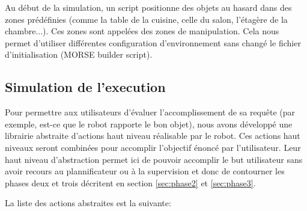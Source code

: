 \documentclass[a4paper,11pt,twoside]{StyleThese}
\begin{document}
 
Au début de la simulation, un script positionne des objets au hasard dans des zones prédéfinies (comme la table de la cuisine, celle du salon, l'étagère de la chambre...). Ces zones sont appelées des zones de manipulation. Cela nous permet d'utiliser différentes configuration d'environnement sans changé le fichier d'initialisation (MORSE builder script).

\subsection{Simulation de l'execution}
\label{section:actions}
Pour permettre aux utilisateurs d'évaluer l'accomplissement de sa requête (par exemple, est-ce que le robot rapporte le bon objet), nous avons développé une librairie abstraite d'actions haut niveau réalisable par le robot. Ces actions haut niveaux seront combinées pour accomplir l'objectif énoncé par l'utilisateur. Leur haut niveau d'abstraction permet ici de pouvoir accomplir le but utilisateur sans avoir recours au plannificateur ou à la supervision et donc de contourner les phases deux et trois décritent en section \ref{sec:phase2} et \ref{sec:phase3}.

La liste des actions abstraites est la suivante:
\end{document}
